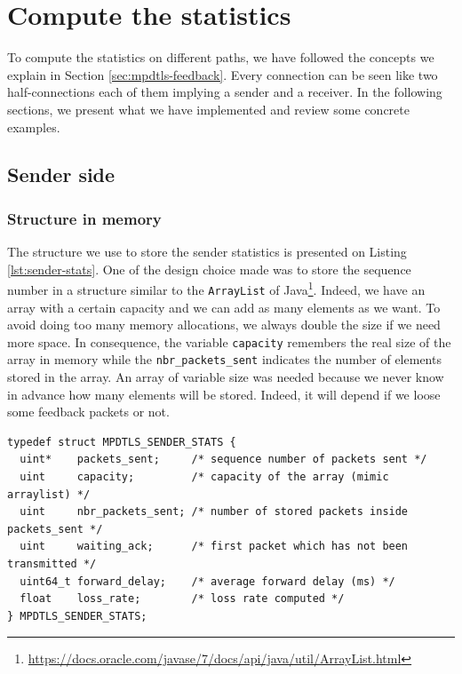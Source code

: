 \section{Compute the statistics}\label{sec:impl-stats}

To compute the statistics on different paths, we have followed the concepts we explain in Section \ref{sec:mpdtls-feedback}. Every connection can be seen like two half-connections each of them implying a sender and a receiver. In the following sections, we present what we have implemented and review some concrete examples. 

\subsection{Sender side}

\subsubsection{Structure in memory}

The structure we use to store the sender statistics is presented on Listing \ref{lst:sender-stats}. One of the design choice made was to store the sequence number in a structure similar to the \texttt{ArrayList} of Java\footnote{\url{https://docs.oracle.com/javase/7/docs/api/java/util/ArrayList.html}}. Indeed, we have an array with a certain capacity and we can add as many elements as we want. To avoid doing too many memory allocations, we always double the size if we need more space. In consequence, the variable \texttt{capacity} remembers the real size of the array in memory while the \texttt{nbr\_packets\_sent} indicates the number of elements stored in the array. An array of variable size was needed because we never know in advance how many elements will be stored. Indeed, it will depend if we loose some feedback packets or not.

\begin{lstlisting}[caption=Sender structure to store statistics, label=lst:sender-stats]
typedef struct MPDTLS_SENDER_STATS {
  uint*    packets_sent;     /* sequence number of packets sent */
  uint     capacity;         /* capacity of the array (mimic arraylist) */
  uint     nbr_packets_sent; /* number of stored packets inside packets_sent */
  uint     waiting_ack;      /* first packet which has not been transmitted */
  uint64_t forward_delay;    /* average forward delay (ms) */
  float    loss_rate;        /* loss rate computed */
} MPDTLS_SENDER_STATS;
\end{lstlisting}

